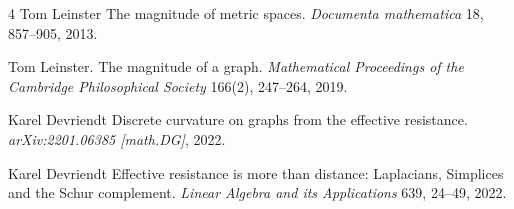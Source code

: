 \documentclass[a4paper]{amsart}
\begin{document}
\begin{thebibliography}{4}
Tom Leinster
\newblock The magnitude of metric spaces. 
\newblock \emph{Documenta mathematica} 18, 857--905, 2013.

Tom Leinster.
\newblock The magnitude of a graph. 
\newblock \emph{Mathematical Proceedings of the Cambridge Philosophical Society} 166(2), 247--264, 2019.

Karel Devriendt
\newblock Discrete curvature on graphs from the effective resistance.
\newblock \emph{arXiv:2201.06385 [math.DG]}, 2022.

Karel Devriendt
\newblock Effective resistance is more than distance: Laplacians, Simplices and the Schur complement.
\newblock \emph{Linear Algebra and its Applications}
639, 24--49, 2022.

\end{thebibliography}
\end{document}
